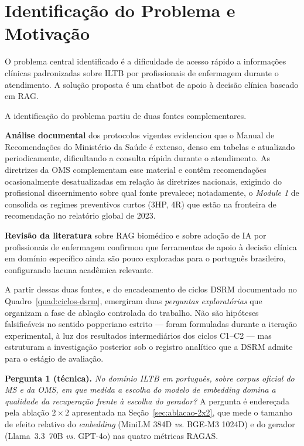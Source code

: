 \documentclass[
  12pt,
  oneside,
  a4paper,
  english,
  brazil
]{abntex2}
\begin{document}
\section{Identificação do Problema e Motivação}

O problema central identificado é a dificuldade de acesso rápido a informações
clínicas padronizadas sobre ILTB por profissionais de enfermagem durante o
atendimento. A solução proposta é um chatbot de apoio à decisão clínica baseado em
RAG.

A identificação do problema partiu de duas fontes complementares.

\textbf{Análise documental} dos protocolos vigentes evidenciou que o Manual de
Recomendações do Ministério da Saúde \cite{brasil2022} é extenso, denso em tabelas
e atualizado periodicamente, dificultando a consulta rápida durante o
atendimento. As diretrizes da OMS
\cite{who2018, who2020consolidatedTB, who2023} complementam esse material e
contêm recomendações ocasionalmente desatualizadas em relação às diretrizes
nacionais, exigindo do profissional discernimento sobre qual fonte prevalece;
notadamente, o \textit{Module 1} de \citeyear{who2020consolidatedTB} consolida
os regimes preventivos curtos (3HP, 4R) que estão na fronteira de
recomendação no relatório global de 2023.

\textbf{Revisão da literatura} sobre RAG biomédico \cite{ocaf2024, lewis2021,
gao2024} e sobre adoção de IA por profissionais de enfermagem \cite{nursingTAM2024}
confirmou que ferramentas de apoio à decisão clínica em domínio específico ainda
são pouco exploradas para o português brasileiro, configurando lacuna acadêmica
relevante.

A partir dessas duas fontes, e do encadeamento de ciclos DSRM
documentado no Quadro~\ref{quad:ciclos-dsrm}, emergiram duas
\emph{perguntas exploratórias} que organizam a fase de ablação
controlada do trabalho. Não são hipóteses falsificáveis no sentido
popperiano estrito --- foram formuladas durante a iteração
experimental, à luz dos resultados intermediários dos ciclos C1--C2 ---
mas estruturam a investigação posterior sob o registro analítico que a
DSRM admite para o estágio de avaliação.

\textbf{Pergunta 1 (técnica).} \emph{No domínio ILTB em português,
sobre corpus oficial do MS e da OMS, em que medida a escolha do modelo
de \emph{embedding} domina a qualidade da recuperação frente à escolha
do gerador?} A pergunta é endereçada pela ablação $2 \times 2$
apresentada na Seção~\ref{sec:ablacao-2x2}, que mede o tamanho de
efeito relativo do \emph{embedding} (MiniLM 384D \textit{vs.} BGE-M3
1024D) e do gerador (Llama~3.3~70B \textit{vs.} GPT-4o) nas quatro
métricas RAGAS.
\end{document}
